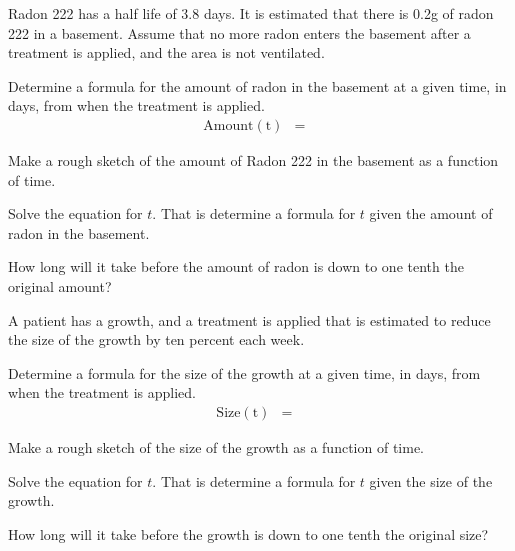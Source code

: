 \begin{problem}
\item Radon 222 has a half life of 3.8 days. It is estimated that
  there is 0.2g of radon 222 in a basement. Assume that no more
  radon enters the basement after a treatment is applied, and the area
  is not ventilated.
  \begin{subproblem}
    \item Determine a formula for the amount of radon in the basement
      at a given time, in days, from when the treatment is applied.
      \begin{eqnarray*}
        \mathrm{Amount(t)} & = &
      \end{eqnarray*}
    \item Make a rough sketch of the amount of Radon 222 in the
      basement as a function of time.
      \vfill
    \item Solve the equation for $t$. That is determine a formula for
      $t$ given the amount of radon in the basement.
      \vfill
    \item How long will it take before the amount of radon is down to
      one tenth the original amount?
      \vfill
  \end{subproblem}

\clearpage

\item A patient has a growth, and a treatment is applied that is
  estimated to reduce the size of the growth by ten percent each
  week.
  \begin{subproblem}
  \item Determine a formula for the size of the growth at a given
    time, in days, from when the treatment is applied.
      \begin{eqnarray*}
        \mathrm{Size(t)} & = &
      \end{eqnarray*}
    \item Make a rough sketch of the size of the growth as a function of time.
      \vfill
    \item Solve the equation for $t$. That is determine a formula for
      $t$ given the size of the growth.
      \vfill
    \item How long will it take before the growth is down to
      one tenth the original size?
      \vfill
  \end{subproblem}


\end{problem}


\postClass


